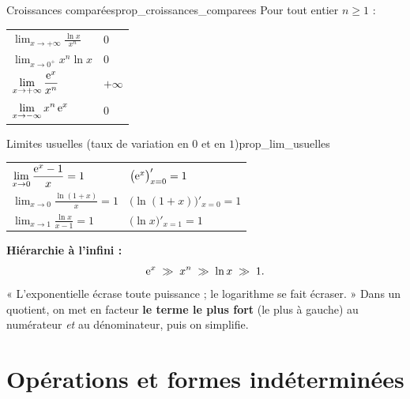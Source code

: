 \begin{propriete}{Croissances comparées}{prop_croissances_comparees}
	Pour tout entier $n\geq 1$ :
	\begin{center}
	\renewcommand{\arraystretch}{2.0}
	\begin{tabular}{>{\raggedright\arraybackslash}p{6.0cm}
	                >{\centering\arraybackslash}p{2.0cm}}
	\hline
	$\displaystyle\lim_{x\to+\infty}\frac{\ln x}{x^n}$              & $0$ \\
	$\displaystyle\lim_{x\to 0^+}x^n\ln x$                          & $0$ \\
	$\displaystyle\lim_{x\to+\infty}\frac{\mathrm{e}^x}{x^n}$               & $+\infty$ \\
	$\displaystyle\lim_{x\to-\infty}x^n\,\mathrm{e}^x$                      & $0$ \\
	\hline
	\end{tabular}
	\end{center}
\end{propriete}

\begin{propriete}{Limites usuelles (taux de variation en $0$ et en $1$)}{prop_lim_usuelles}
	\begin{center}
	\renewcommand{\arraystretch}{2.0}
	\setlength{\tabcolsep}{4pt}
	\begin{tabular}{>{\raggedright\arraybackslash}p{4.3cm}
	                >{\raggedleft\arraybackslash}p{4.3cm}}
	\hline
	$\displaystyle\lim_{x\to 0}\frac{\mathrm{e}^x-1}{x}=1$ &
	$\bigl(\mathrm{e}^x\bigr)'_{x=0}=1$ \\
	$\displaystyle\lim_{x\to 0}\frac{\ln(1+x)}{x}=1$ &
	$\bigl(\ln(1+x)\bigr)'_{x=0}=1$ \\
	$\displaystyle\lim_{x\to 1}\frac{\ln x}{x-1}=1$ &
	$\bigl(\ln x\bigr)'_{x=1}=1$ \\
	\hline
	\end{tabular}
	\end{center}
\end{propriete}

\begin{astucebac}
	\textbf{Hiérarchie à l'infini :}
	\[
	\mathrm{e}^x \;\gg\; x^n \;\gg\; \ln x \;\gg\; 1 .
	\]
	« L'exponentielle écrase toute puissance ; le logarithme se fait écraser. »
	Dans un quotient, on met en facteur \textbf{le terme le plus fort}
	(le plus à gauche) au numérateur \emph{et} au dénominateur, puis on simplifie.
\end{astucebac}


\section{Opérations et formes indéterminées}

